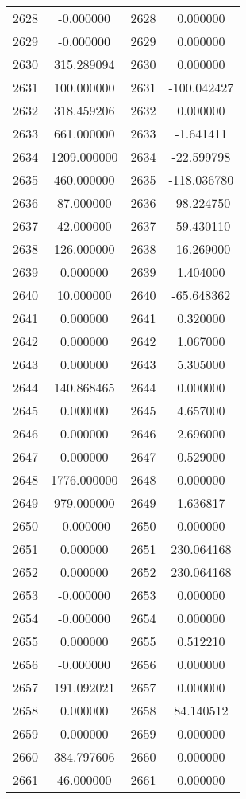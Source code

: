\documentclass[12pt]{article}
\begin{document}
\begin{longtable}{@{}cccc@{}}
2628 & -0.000000 & 2628 & 0.000000 \\
2629 & -0.000000 & 2629 & 0.000000 \\
2630 & 315.289094 & 2630 & 0.000000 \\
2631 & 100.000000 & 2631 & -100.042427 \\
2632 & 318.459206 & 2632 & 0.000000 \\
2633 & 661.000000 & 2633 & -1.641411 \\
2634 & 1209.000000 & 2634 & -22.599798 \\
2635 & 460.000000 & 2635 & -118.036780 \\
2636 & 87.000000 & 2636 & -98.224750 \\
2637 & 42.000000 & 2637 & -59.430110 \\
2638 & 126.000000 & 2638 & -16.269000 \\
2639 & 0.000000 & 2639 & 1.404000 \\
2640 & 10.000000 & 2640 & -65.648362 \\
2641 & 0.000000 & 2641 & 0.320000 \\
2642 & 0.000000 & 2642 & 1.067000 \\
2643 & 0.000000 & 2643 & 5.305000 \\
2644 & 140.868465 & 2644 & 0.000000 \\
2645 & 0.000000 & 2645 & 4.657000 \\
2646 & 0.000000 & 2646 & 2.696000 \\
2647 & 0.000000 & 2647 & 0.529000 \\
2648 & 1776.000000 & 2648 & 0.000000 \\
2649 & 979.000000 & 2649 & 1.636817 \\
2650 & -0.000000 & 2650 & 0.000000 \\
2651 & 0.000000 & 2651 & 230.064168 \\
2652 & 0.000000 & 2652 & 230.064168 \\
2653 & -0.000000 & 2653 & 0.000000 \\
2654 & -0.000000 & 2654 & 0.000000 \\
2655 & 0.000000 & 2655 & 0.512210 \\
2656 & -0.000000 & 2656 & 0.000000 \\
2657 & 191.092021 & 2657 & 0.000000 \\
2658 & 0.000000 & 2658 & 84.140512 \\
2659 & 0.000000 & 2659 & 0.000000 \\
2660 & 384.797606 & 2660 & 0.000000 \\
2661 & 46.000000 & 2661 & 0.000000 \\

\end{longtable}
\end{document}
